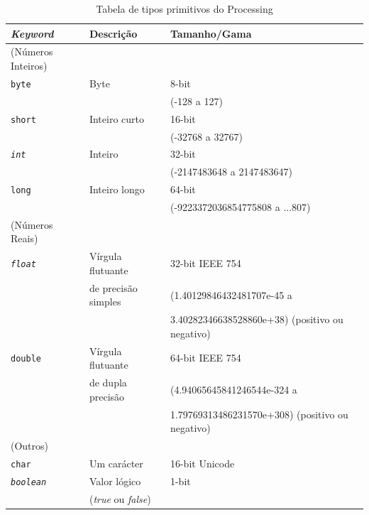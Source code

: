 \begin{table}[!hb]
\centering
{\small
\begin{tabular}{lll}
\emph{Keyword}					&Descrição																			& Tamanho/Gama \\
\hline
(Números Inteiros)			&&\\
\texttt{byte}						&Byte																						&8-bit\\
												& 																							&(-128 a 127)\\
\texttt{short}					&Inteiro curto																	&16-bit\\
												& 																							&(-32768 a 32767)\\
\emph{\texttt{int}}			&Inteiro																				&32-bit\\
												&																								&(-2147483648 a 2147483647)\\
\texttt{long}						&Inteiro longo																	&64-bit\\
												&																								&(-9223372036854775808 a ...807)\\
\hline
(Números Reais)					&&\\
\emph{\texttt{float}}		& Vírgula flutuante 														&32-bit IEEE 754\\
												&de precisão simples														&(1.40129846432481707e-45 a\\ 
												&																								&3.40282346638528860e+38) (positivo ou negativo)\\
\texttt{double}					& Vírgula flutuante 														&	64-bit IEEE 754\\
												& de dupla precisão															&(4.94065645841246544e-324 a\\
												&  																							& 1.79769313486231570e+308) (positivo ou negativo)	\\
\hline
(Outros)								&&\\
\texttt{char} 					&	Um carácter																		&16-bit Unicode\\
\emph{\texttt{boolean}}	& Valor lógico 																	&1-bit\\
& (\emph{true} ou \emph{false})		& \\
\end{tabular}}
\caption{Tabela de tipos primitivos do Processing}\label{tab:tiposprimitivos}
\end{table}
